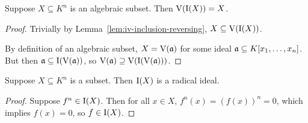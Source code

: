 \begin{lemma}\label{lem:vix-x}
    Suppose \(X \subseteq K^n\) is an algebraic subset.
    Then \(\operatorname{V}(\operatorname{I}(X)) = X\).
\end{lemma}
\begin{proof}
    Trivially by Lemma~\ref{lem:iv-inclusion-reversing},
    \(X \subseteq \operatorname{V}(\operatorname{I}(X))\).

    By definition of an algebraic subset,
    \(X = \operatorname{V}(\mathfrak{a})\) for some ideal \(\mathfrak{a} \subseteq K[x_1,\hdots,x_n]\).
    But then \(\mathfrak{a} \subseteq \operatorname{I}(\operatorname{V}(\mathfrak{a}))\),
    so \(\operatorname{V}(\mathfrak{a}) \supseteq \operatorname{V}(\operatorname{I}(\operatorname{V}(\mathfrak{a})))\).
\end{proof}
\begin{lemma}\label{lem:ix-radical}
    Suppose \(X \subseteq K^n\) is a subset.
    Then \(\operatorname{I}(X)\) is a radical ideal.
\end{lemma}
\begin{proof}
    Suppose \(f^n \in \operatorname{I}(X)\).
    Then for all \(x \in X\), \(f^n(x) = {(f(x))}^n = 0\),
    which implies \(f(x) = 0\), so \(f \in \operatorname{I}(X)\).
\end{proof}

